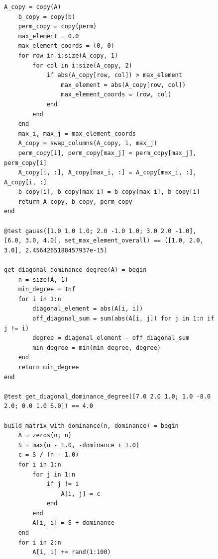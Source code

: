 \documentclass[a4paper, 14pt]{extarticle}
\begin{document}
\begin{figure}[!htb]
\begin{lstlisting}[language={},caption={Метод Гаусса (продолжение)},label={lst:code5}]
    A_copy = copy(A)
    b_copy = copy(b)
    perm_copy = copy(perm)
    max_element = 0.0
    max_element_coords = (0, 0)
    for row in i:size(A_copy, 1)
        for col in i:size(A_copy, 2)
            if abs(A_copy[row, col]) > max_element
                max_element = abs(A_copy[row, col])
                max_element_coords = (row, col)
            end
        end
    end
    max_i, max_j = max_element_coords
    A_copy = swap_columns(A_copy, i, max_j)
    perm_copy[i], perm_copy[max_j] = perm_copy[max_j], perm_copy[i]
    A_copy[i, :], A_copy[max_i, :] = A_copy[max_i, :], A_copy[i, :]
    b_copy[i], b_copy[max_i] = b_copy[max_i], b_copy[i]
    return A_copy, b_copy, perm_copy
end

@test gauss([1.0 1.0 1.0; 2.0 -1.0 1.0; 3.0 2.0 -1.0], [6.0, 3.0, 4.0], set_max_element_overall) == ([1.0, 2.0, 3.0], 2.4564265188457937e-15)

get_diagonal_dominance_degree(A) = begin
    n = size(A, 1)
    min_degree = Inf
    for i in 1:n
        diagonal_element = abs(A[i, i])
        off_diagonal_sum = sum(abs(A[i, j]) for j in 1:n if j != i)
        degree = diagonal_element - off_diagonal_sum
        min_degree = min(min_degree, degree)
    end
    return min_degree
end

@test get_diagonal_dominance_degree([7.0 2.0 1.0; 1.0 -8.0 2.0; 0.0 1.0 6.0]) == 4.0

build_matrix_with_dominance(n, dominance) = begin
    A = zeros(n, n)
    S = max(n - 1.0, -dominance + 1.0)
    c = S / (n - 1.0)
    for i in 1:n
        for j in 1:n
            if j != i
                A[i, j] = c
            end
        end
        A[i, i] = S + dominance
    end
    for i in 2:n
        A[i, i] += rand(1:100)
\end{lstlisting}
\end{figure}
\end{document}
